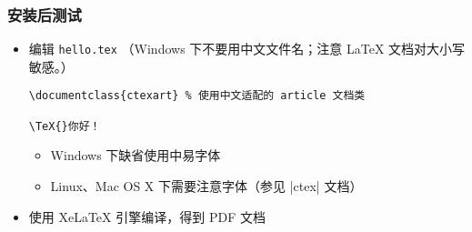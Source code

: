 



\begin{frame}[fragile]
  \frametitle{安装后测试}

  \begin{itemize}
    \item 编辑 \texttt{hello.tex} （Windows 下不要用中文文件名；注意
      \LaTeX{} 文档对大小写敏感。）
      \lstset{language=[LaTeX]TeX}
      \begin{card} \begin{lstlisting}[basicstyle=\ttfamily]
\documentclass{ctexart} % 使用中文适配的 article 文档类

\TeX{}你好！

        \end{lstlisting}\end{card}
      \begin{itemize}
        \item Windows 下缺省使用中易字体
        \item Linux、Mac OS X 下需要注意字体（参见 |ctex| 文档）
      \end{itemize}
    \item 使用 XeLaTeX 引擎编译，得到 PDF 文档
      \begin{center}
      \end{center}
  \end{itemize}
\end{frame}

